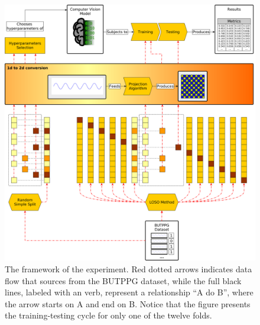 \begin{figure}
	\includegraphics[width=\textwidth]{img/framework.png}
	\caption[The framework of the experiment.]{The framework of the experiment. Red dotted arrows indicates data flow that sources from the \acrlong{BUTPPG} dataset, while the full black lines, labeled with an verb, represent a relationship ``A do B'', where the arrow starts on A and end on B. Notice that the figure presents the training-testing cycle for only one of the twelve folds.}
	\label{fig:framework}
\end{figure}
